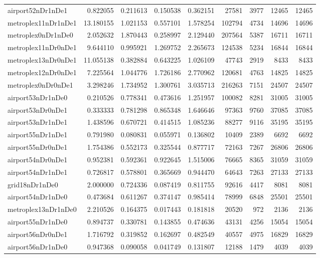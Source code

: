 \begin{longtable}{|l|r|r|r|r|r|r|r|r|}
airport52nDr1nDe1 & 0.822055 & 0.211613 & 0.150538 & 0.362151 & 27581 & 3977 & 12465 & 12465 \\
metroplex11nDr1nDe1 & 13.180155 & 1.021153 & 0.557101 & 1.578254 & 102794 & 4734 & 14696 & 14696 \\
metroplex0nDr1nDe0 & 2.052632 & 1.870443 & 0.258997 & 2.129440 & 207564 & 5387 & 16711 & 16711 \\
metroplex11nDr0nDe1 & 9.644110 & 0.995921 & 1.269752 & 2.265673 & 124538 & 5234 & 16844 & 16844 \\
metroplex13nDr0nDe1 & 11.055138 & 0.382884 & 0.643225 & 1.026109 & 47743 & 2919 & 8433 & 8433 \\
metroplex12nDr0nDe1 & 7.225564 & 1.044776 & 1.726186 & 2.770962 & 120681 & 4763 & 14825 & 14825 \\
metroplex0nDr0nDe1 & 3.298246 & 1.734952 & 1.300761 & 3.035713 & 216263 & 7151 & 24507 & 24507 \\
airport53nDr1nDe0 & 0.210526 & 0.778341 & 0.473616 & 1.251957 & 100082 & 8281 & 31005 & 31005 \\
airport53nDr0nDe1 & 0.333333 & 0.781298 & 0.865348 & 1.646646 & 97363 & 9760 & 37085 & 37085 \\
airport53nDr1nDe1 & 1.438596 & 0.670721 & 0.414515 & 1.085236 & 88277 & 9116 & 35195 & 35195 \\
airport55nDr1nDe1 & 0.791980 & 0.080831 & 0.055971 & 0.136802 & 10409 & 2389 & 6692 & 6692 \\
airport55nDr0nDe1 & 1.754386 & 0.552173 & 0.325544 & 0.877717 & 72163 & 7267 & 26806 & 26806 \\
airport54nDr0nDe1 & 0.952381 & 0.592361 & 0.922645 & 1.515006 & 76665 & 8365 & 31059 & 31059 \\
airport54nDr1nDe1 & 0.726817 & 0.578801 & 0.365669 & 0.944470 & 64643 & 7263 & 27133 & 27133 \\
grid18nDr1nDe0 & 2.000000 & 0.724336 & 0.087419 & 0.811755 & 92616 & 4417 & 8081 & 8081 \\
airport54nDr1nDe0 & 0.473684 & 0.611267 & 0.374147 & 0.985414 & 78999 & 6848 & 25501 & 25501 \\
metroplex13nDr1nDe0 & 2.210526 & 0.164375 & 0.017443 & 0.181818 & 20520 & 972 & 2136 & 2136 \\
airport55nDr1nDe0 & 0.894737 & 0.330781 & 0.143855 & 0.474636 & 43131 & 4256 & 15054 & 15054 \\
airport56nDr0nDe1 & 1.716792 & 0.319852 & 0.162697 & 0.482549 & 40557 & 4975 & 16829 & 16829 \\
airport56nDr1nDe0 & 0.947368 & 0.090058 & 0.041749 & 0.131807 & 12188 & 1479 & 4039 & 4039 \\

\end{longtable}
